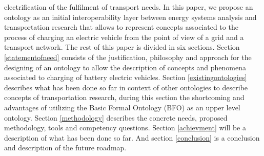 electrification of the fulfilment of transport needs. In this paper, we propose
an ontology as an initial interoperability layer between energy systems
analysis and transportation research that allows to represent concepts associated to
the process of charging an electric vehicle from the point of view of a grid
and a transport network. The rest of this paper is divided in six sections.
Section \ref{statementofneed} consists of the justification, philosophy and
approach for the designing of an ontology to allow the description of concepts
and phenomena associated to charging of battery electric vehicles. Section
\ref{existingontologies} describes what has been done so far in context of
other ontologies to describe concepts of transportation research, during this
section the shortcoming and advantages of utilizing the Basic Formal Ontology
(BFO) \cite{Arp.2015} as an upper level ontology. Section \ref{methodology}
describes the concrete needs, proposed methodology, tools and competency
questions. Section \ref{achievment} will be a description of what has been done
so far. And section \ref{conclusion} is a conclusion and description of the
future roadmap.

